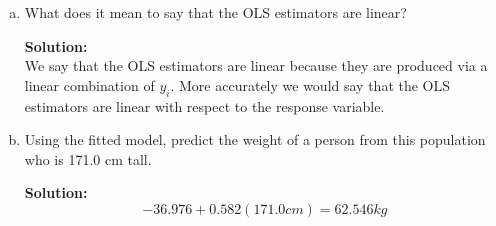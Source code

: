 \documentclass[12pt]{article}
\makeatletter
\theoremstyle{homework}
\newenvironment{exercise}[1]
{\def\@currentlabel{#1}\exercisecore}
{\endexercisecore}
\newcommand{\localhead}[1]{\par\smallskip\noindent\textbf{#1}\nobreak\\}%
\newcommand\solution{\localhead{Solution:}}
\makeatother
\begin{document}
\begin{exercise}{2}
\begin{enumerate}[a.]
    \item What does it mean to say that the OLS estimators are linear?\\
    \solution We say that the OLS estimators are linear because they are produced via a linear combination of 
    $y_i$. More accurately we would say that the OLS estimators are linear with respect to the response variable.
    \vspace{.15in}

    \item Using the fitted model, predict the weight of a person from this population who is 171.0 cm tall. 
    \solution
    \begin{equation*}
      -36.976 +  0.582(171.0cm) = 62.546kg
    \end{equation*}
  \end{enumerate}
\end{exercise}
\newpage
\end{document}
